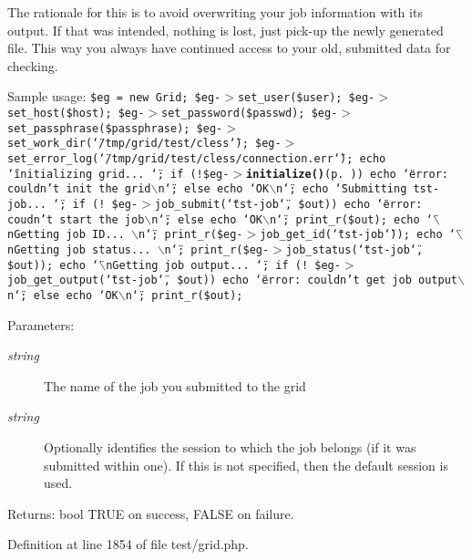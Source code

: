The rationale for this is to avoid overwriting your job information with its output. If that was intended, nothing is lost, just pick-up the newly generated file. This way you always have continued access to your old, submitted data for checking.

Sample usage: {\tt  \$eg = new Grid; \$eg-$>$set\_\-user(\$user); \$eg-$>$set\_\-host(\$host); \$eg-$>$set\_\-password(\$passwd); \$eg-$>$set\_\-passphrase(\$passphrase); \$eg-$>$set\_\-work\_\-dir(\char`\"{}/tmp/grid/test/cless\char`\"{}); \$eg-$>$set\_\-error\_\-log(\char`\"{}/tmp/grid/test/cless/connection.err\char`\"{}); echo \char`\"{}initializing grid... \char`\"{}; if (!\$eg-$>${\bf initialize()}{\rm (p.\,\pageref{classGrid_a11})}) echo \char`\"{}error: couldn't init the grid$\backslash$n\char`\"{}; else echo \char`\"{}OK$\backslash$n\char`\"{}; echo \char`\"{}Submitting tst-job... \char`\"{}; if (! \$eg-$>$job\_\-submit(\char`\"{}tst-job\char`\"{}, \$out)) echo \char`\"{}error: coudn't start the job$\backslash$n\char`\"{}; else echo \char`\"{}OK$\backslash$n\char`\"{}; print\_\-r(\$out); echo \char`\"{}$\backslash$n\-Getting job ID... $\backslash$n\char`\"{}; print\_\-r(\$eg-$>$job\_\-get\_\-id(\char`\"{}tst-job\char`\"{})); echo \char`\"{}$\backslash$n\-Getting job status... $\backslash$n\char`\"{}; print\_\-r(\$eg-$>$job\_\-status(\char`\"{}tst-job\char`\"{}, \$out)); echo \char`\"{}$\backslash$n\-Getting job output... \char`\"{}; if (! \$eg-$>$job\_\-get\_\-output(\char`\"{}tst-job\char`\"{}, \$out)) echo \char`\"{}error: couldn't get job output$\backslash$n\char`\"{}; else echo \char`\"{}OK$\backslash$n\char`\"{}; print\_\-r(\$out); }

\begin{Desc}
\item[Parameters:]
\begin{description}
\item[{\em string}]The name of the job you submitted to the grid \item[{\em string}]Optionally identifies the session to which the job belongs (if it was submitted within one). If this is not specified, then the default session is used. \end{description}
\end{Desc}
\begin{Desc}
\item[Returns:]bool TRUE on success, FALSE on failure. \end{Desc}


Definition at line 1854 of file test/grid.php.

